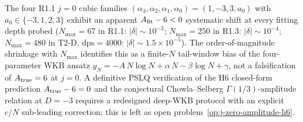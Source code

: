\begin{remark}[$j=0$ amplitude and finite-$N$ artefact]\label{rem:j-zero-finite-N}
The four R1.1 $j=0$ cubic families
$(\alpha_3,\alpha_2,\alpha_1,\alpha_0) = (1,-3,3,a_0)$ with
$a_0\in\{-3,1,2,3\}$ exhibit an apparent $A_{\rm fit}-6 < 0$
systematic shift at every fitting depth probed
($N_{\max}\!=\!67$ in R1.1: $|\delta|\sim 10^{-3}$;
$N_{\max}\!=\!250$ in R1.3: $|\delta|\sim 10^{-4}$;
$N_{\max}\!=\!480$ in T2-D, $\mathrm{dps}=4000$:
$|\delta|\sim 1.5\!\times\! 10^{-5}$). The order-of-magnitude
shrinkage with $N_{\max}$ identifies this as a finite-$N$
tail-window bias of the four-parameter WKB ansatz
$y_N = -A\,N\log N + \alpha\,N - \beta\log N + \gamma$, not a
falsification of $A_{\rm true}=6$ at $j=0$. A definitive PSLQ
verification of the H6 closed-form prediction
$A_{\rm true}-6 = 0$ and the conjectural Chowla--Selberg
$\Gamma(1/3)$-amplitude relation at $D=-3$ requires a redesigned
deep-WKB protocol with an explicit $c/N$ sub-leading correction;
this is left as open problem~\ref{op:j-zero-amplitude-h6}.
\end{remark}

